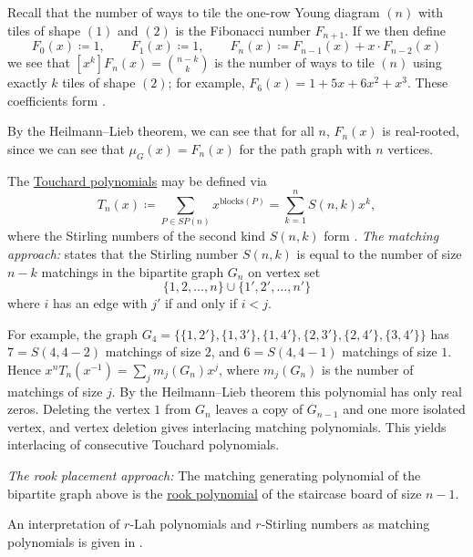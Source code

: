 \begin{example*}
Recall that the number of ways to tile the one-row Young diagram $(n)$
with tiles of shape $(1)$ and $(2)$ is the Fibonacci number $F_{n+1}$.
If we then define
\[
 F_0(x) \coloneqq 1,\qquad
 F_1(x) \coloneqq 1,\qquad
 F_n(x) \coloneqq F_{n-1}(x) + x\cdot F_{n-2}(x)
\]
we see that $[x^k] F_n(x)=\binom{n-k}{k}$ is the number of ways to tile
$(n)$ using exactly $k$ tiles of shape $(2)$; for example,
$F_6(x)=1+5x+6x^2+x^3$.  These coefficients form .

By the Heilmann--Lieb theorem, we can see that for all $n$, $F_n(x)$ is real-rooted,
since we can see that $\mu_G(x) = F_n(x)$ for the path graph with $n$ vertices.
\end{example*}




\begin{example*}\label{touchardAsMatching}

The \hyperref[touchardPolynomial]{Touchard polynomials} may be defined via
\[
T_n(x) \coloneqq
\sum_{P \in SP(n)} x^{\mathrm{blocks}(P)}
= \sum_{k=1}^n S(n,k) x^k,
\]
where the Stirling numbers of the second kind $S(n,k)$ form .
\emph{The matching approach:} \cite[Lem.~5.1]{Godsil2017} states
that the Stirling number $S(n,k)$ is equal to the number
of size $n-k$ matchings in the bipartite graph $G_n$ on vertex set
\[
 \{1,2,\dotsc,n\} \cup \{1',2',\dotsc,n'\}
\]
where $i$ has an edge with $j'$ if and only if $i \lt j$.

For example, the graph
$G_4 = \{ \{1,2'\}, \{1,3'\}, \{1,4'\}, \{2,3'\}, \{2,4'\}, \{3,4'\} \}$
has $7=S(4,4-2)$ matchings of size $2$,
and $6=S(4,4-1)$ matchings of size $1$.
Hence $x^n T_n(x^{-1})=\sum_{j}m_j(G_n)x^j$, where $m_j(G_n)$ is the number
of matchings of size $j$.  By the Heilmann--Lieb theorem this polynomial has
only real zeros.  Deleting the vertex $1$ from $G_n$ leaves a copy of
$G_{n-1}$ and one more isolated vertex, and vertex deletion gives
interlacing matching polynomials.  This yields interlacing of consecutive
Touchard polynomials.


\emph{The rook placement approach:}
The matching generating polynomial of the bipartite graph above is the
\hyperref[rookPolynomial]{rook polynomial} of the staircase board of size
$n-1$.

\end{example*}


\begin{example*}

An interpretation of $r$-Lah polynomials and $r$-Stirling numbers as
matching polynomials is given in \cite{NyulRacz2021}.
\end{example*}



